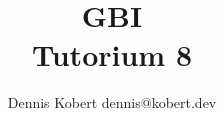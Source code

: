 \title[Grundbegriffe der Informatik]{GBI\\Tutorium 8}
\date{\tutdate}
\subtitle{\tutTitle}
\author{Dennis Kobert dennis@kobert.dev}

\institute{}


%


%
